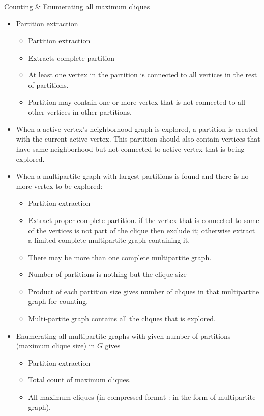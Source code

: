 \documentclass[landscape]{slides}
\begin{document}
\begin{slide}
	\begin{center}
		{\large Counting \& Enumerating all maximum cliques}
	\end{center}
	\begin{itemize}
		\setlength{\itemsep}{0pt}
		\setlength{\parskip}{5pt}
		\setlength{\parsep}{0pt}
		\item Partition extraction
		\begin{itemize}
			\setlength{\itemsep}{0pt}
			\setlength{\parskip}{5pt}
			\setlength{\parsep}{0pt}
			\item Partition extraction
			\item Extracts complete partition
			\item At least one vertex in the partition is connected to all vertices in the rest of partitions.
			\item Partition may contain one or more vertex that is not connected to all other vertices in other partitions.
		\end{itemize}
		\item When a active vertex's neighborhood graph is explored, a partition is created with the current active vertex. This partition should also contain vertices that have same neighborhood but not connected to active vertex that is being explored.
		\item When a multipartite graph with largest partitions is found and there is no more vertex to be explored:
		\begin{itemize}
			\setlength{\itemsep}{0pt}
			\setlength{\parskip}{5pt}
			\setlength{\parsep}{0pt}
			\item Partition extraction
			\item Extract proper complete partition. if the vertex that is connected to some of the vertices is not part of the clique then exclude it; otherwise extract a limited complete multipartite graph containing it.
			\item There may be more than one complete multipartite graph.
			\item Number of partitions is nothing but the clique size
			\item Product of each partition size gives number of cliques in that multipartite graph for counting.
			\item Multi-partite graph contains all the cliques that is explored.
		\end{itemize}
		\item Enumerating all multipartite graphs with given number of partitions (maximum clique size) in $G$ gives
			\begin{itemize}
				\setlength{\itemsep}{0pt}
				\setlength{\parskip}{5pt}
				\setlength{\parsep}{0pt}
				\item Partition extraction
				\item Total count of maximum cliques.
				\item All maximum cliques (in compressed format : in the form of multipartite graph).
			\end{itemize}
	\end{itemize}
\end{slide}
\end{document}

